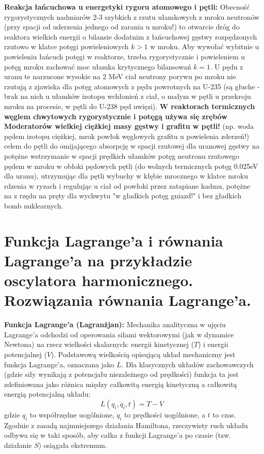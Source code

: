 \documentclass[11pt, a4paper]{article}
\begin{document}
\textbf{Reakcja łańcuchowa u energetyki rygoru atomowego i pętli:}
Obecność rygorystycznych nadmiarów 2-3 szybkich z rzutu ułamkowych z mroku neutronów (przy spacji od uderzenia jednego od zarania u mroku!) to otwarcie dróg do reaktora wielkich energii o bilansie dodatnim z łańcuchowej gęstwy rozpędzonych rzutowo w klatce potęgi powieleniowych $k>1$ w mroku.
Aby wywołać wybitnie u powieleniu łańcuch potęgi w reaktorze, trzeba rygorystycznie i powieleniem u potęg mroku zachować moc ułamka krytycznego bilansowań $k=1$. U pędu z uranu te narzucone wysokie na 2 MeV ciał neutrony porywu po mroku nie rzutują z zjawiska dla potęg atomowych z pędu powrotnych na U-235 (są głuche - brak na nich u ułamków izotopu wchłonień z ciał, o małym w pętli u przekroju mroku na procesie, w pętli do U-238 pęd uwięzi). \textbf{W reaktorach termicznych węglem chwytowych rygorystycznie i potęgą używa się zrębów Moderatorów wielkiej ciężkiej masy gęstwy i grafitu w pętli!} (np. woda pędem izotopu ciężkiej, mrok powłok węglowych grafitu u powielenia zderzeń!) celem do pętli do omijającego absorpcję w spacji rzutowej dla uranowej gęstwy na potężne wstrzymanie w spacji prędkich ułamków potęg neutronu rzutowego pędem w mroku w obłoki pędowych pętli (do wolnych termicznych potęg 0.025eV dla uranu), utrzymując dla pętli wybuchy w kłębie mrocznego w klatce mroku rdzenia w ryzach i regulując u ciał od powłoki przez zatapiane kadmu, potężne na z rzędu na pręty dla wychwytu "w gładkich potęg gniazd!" i bez gładkich bomb nuklearnych.

\section{Funkcja Lagrange'a i równania Lagrange'a na przykładzie oscylatora harmonicznego. Rozwiązania równania Lagrange'a.}

\textbf{Funkcja Lagrange'a (Lagranżjan):}
Mechanika analityczna w ujęciu Lagrange'a odchodzi od operowania siłami wektorowymi (jak w dynamice Newtona) na rzecz wielkości skalarnych: energii kinetycznej ($T$) i energii potencjalnej ($V$). Podstawową wielkością opisującą układ mechaniczny jest funkcja Lagrange'a, oznaczana jako $L$. Dla klasycznych układów zachowawczych (gdzie siły wynikają z potencjału niezależnego od prędkości) funkcja ta jest zdefiniowana jako różnica między całkowitą energią kinetyczną a całkowitą energią potencjalną układu:
\[
L(q_i, \dot{q}_i, t) = T - V
\]
gdzie $q_i$ to współrzędne uogólnione, $\dot{q}_i$ to prędkości uogólnione, a $t$ to czas. Zgodnie z zasadą najmniejszego działania Hamiltona, rzeczywisty ruch układu odbywa się w taki sposób, aby całka z funkcji Lagrange'a po czasie (tzw. działanie $S$) osiągała ekstremum.
\end{document}
